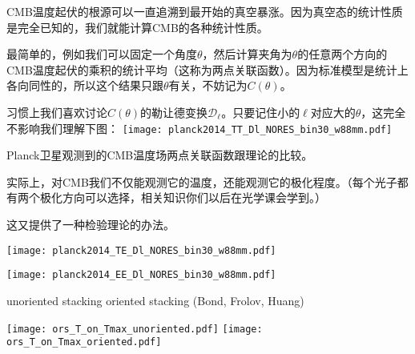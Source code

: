 \documentclass[CJK]{beamer}
\begin{document}
\begin{frame}
\bch
CMB温度起伏的根源可以一直追溯到最开始的真空暴涨。因为真空态的统计性质是完全已知的，我们就能计算CMB的各种统计性质。

\skipline
最简单的，例如我们可以固定一个角度$\theta$，然后计算夹角为$\theta$的任意两个方向的CMB温度起伏的乘积的统计平均（这称为两点关联函数）。因为标准模型是统计上各向同性的，所以这个结果只跟$\theta$有关，不妨记为$C(\theta)$。
\ech
\end{frame}

\begin{frame}
\bch
习惯上我们喜欢讨论$C(\theta)$的勒让德变换$\mathcal{D}_\ell$。只要记住小的$\ell$对应大的$\theta$，这完全不影响我们理解下图：
  \texttt{[image: planck2014\_TT\_Dl\_NORES\_bin30\_w88mm.pdf]}

  Planck卫星观测到的CMB温度场两点关联函数跟理论的比较。
\ech
\end{frame}

\begin{frame}
\bch
实际上，对CMB我们不仅能观测它的温度，还能观测它的极化程度。（每个光子都有两个极化方向可以选择，相关知识你们以后在光学课会学到。）


这又提供了一种检验理论的办法。
\ech
\end{frame}


\begin{frame}
  \texttt{[image: planck2014\_TE\_Dl\_NORES\_bin30\_w88mm.pdf]}
\end{frame}

\begin{frame}
  \texttt{[image: planck2014\_EE\_Dl\_NORES\_bin30\_w88mm.pdf]}
\end{frame}


\begin{frame}
  
  {\hskip 0.2in} {\scriptsize unoriented stacking}     {\hskip 0.65in} {\scriptsize oriented stacking (Bond, Frolov, Huang)}
            
  \texttt{[image: ors\_T\_on\_Tmax\_unoriented.pdf]}  
  \texttt{[image: ors\_T\_on\_Tmax\_oriented.pdf]}
\end{frame}
\end{document}
